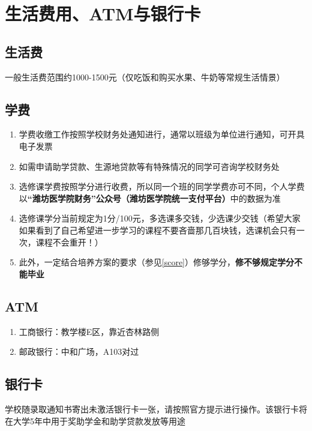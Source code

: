 \chapter[生活费用、ATM与银行卡]{生活费用、ATM与银行卡}
\section[生活费]{生活费}
一般生活费范围约1000-1500元（仅吃饭和购买水果、牛奶等常规生活情景）

\section[学费]{学费}
\begin{enumerate}
    \item 学费收缴工作按照学校财务处通知进行，通常以班级为单位进行通知，可开具电子发票
    \item 如需申请助学贷款、生源地贷款等有特殊情况的同学可咨询学校财务处
    \item 选修课学费按照学分进行收费，所以同一个班的同学学费亦可不同，个人学费以\textbf{“潍坊医学院财务”公众号（潍坊医学院统一支付平台）}中的数据为准
    \item 选修课学分当前规定为1分/100元，多选课多交钱，少选课少交钱（希望大家如果看到了自己希望进一步学习的课程不要吝啬那几百块钱，选课机会只有一次，课程不会重开！）
    \item 此外，一定结合培养方案的要求（参见\uline{\ref{score}}）修够学分，\textbf{修不够规定学分不能毕业}
\end{enumerate}

\section[ATM]{ATM\footnotemark}
\begin{enumerate}
    \item 工商银行：教学楼E区，靠近杏林路侧
    \item 邮政银行：中和广场，A103对过
\end{enumerate}

\section[银行卡]{银行卡}
学校随录取通知书寄出未激活银行卡一张，请按照官方提示进行操作。该银行卡将在大学5年中用于奖助学金和助学贷款发放等用途
